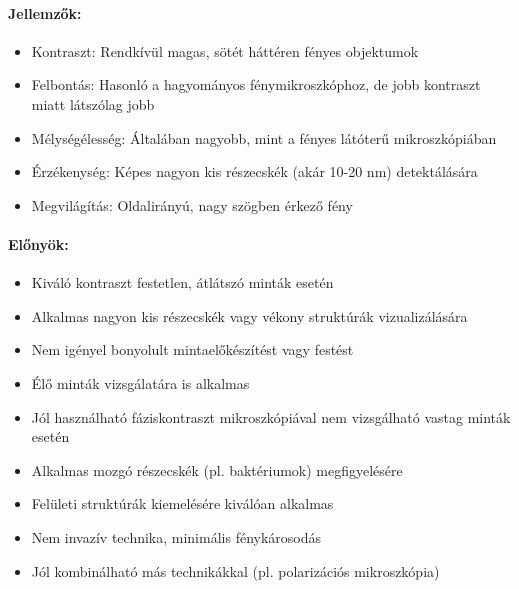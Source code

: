 \documentclass[a4paper,12pt]{article}
\begin{document}
\paragraph{Jellemzők:} \begin{itemize} \item Kontraszt: Rendkívül magas, sötét háttéren fényes objektumok \item Felbontás: Hasonló a hagyományos fénymikroszkóphoz, de jobb kontraszt miatt látszólag jobb \item Mélységélesség: Általában nagyobb, mint a fényes látóterű mikroszkópiában \item Érzékenység: Képes nagyon kis részecskék (akár 10-20 nm) detektálására \item Megvilágítás: Oldalirányú, nagy szögben érkező fény \end{itemize}

\paragraph{Előnyök:} \begin{itemize} \item Kiváló kontraszt festetlen, átlátszó minták esetén \item Alkalmas nagyon kis részecskék vagy vékony struktúrák vizualizálására \item Nem igényel bonyolult mintaelőkészítést vagy festést \item Élő minták vizsgálatára is alkalmas \item Jól használható fáziskontraszt mikroszkópiával nem vizsgálható vastag minták esetén \item Alkalmas mozgó részecskék (pl. baktériumok) megfigyelésére \item Felületi struktúrák kiemelésére kiválóan alkalmas \item Nem invazív technika, minimális fénykárosodás \item Jól kombinálható más technikákkal (pl. polarizációs mikroszkópia) \end{itemize}
\end{document}
